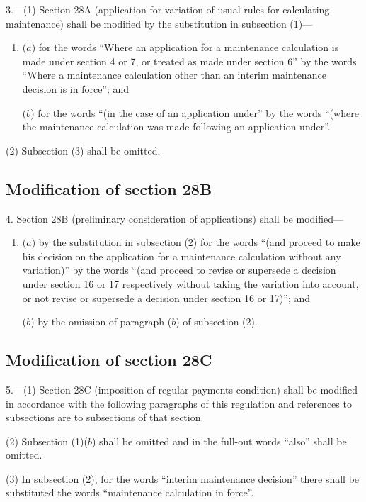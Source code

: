 \documentclass[12pt,a4paper]{article}
\begin{document}
3.---(1)  Section 28A (application for variation of usual rules for calculating maintenance) shall be modified by the substitution in subsection (1)—
\begin{enumerate}\item[]
($a$) for the words “Where an application for a maintenance calculation is made under section 4 or 7, or treated as made under section 6” by the words “Where a maintenance calculation other than an interim maintenance decision is in force”; and

($b$) for the words “(in the case of an application under” by the words “(where the maintenance calculation was made following an application under”.
\end{enumerate}

(2) Subsection (3) shall be omitted.

\subsection[4. Modification of section 28B]{Modification of section 28B}

4.  Section 28B (preliminary consideration of applications) shall be modified—
\begin{enumerate}\item[]
($a$) by the substitution in subsection (2) for the words “(and proceed to make his decision on the application for a maintenance calculation without any variation)” by the words “(and proceed to revise or supersede a decision under section 16 or 17 respectively without taking the variation into account, or not revise or supersede a decision under section 16 or 17)”; and

($b$) by the omission of paragraph ($b$)  of subsection (2).
\end{enumerate}

\subsection[5. Modification of section 28C]{Modification of section 28C}

5.---(1)  Section 28C (imposition of regular payments condition) shall be modified in accordance with the following paragraphs of this regulation and references to subsections are to subsections of that section.

(2) Subsection (1)($b$)  shall be omitted and in the full-out words “also” shall be omitted.

(3) In subsection (2), for the words “interim maintenance decision” there shall be substituted the words “maintenance calculation in force”.
\end{document}
